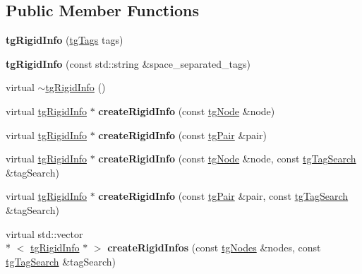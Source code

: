 \subsection*{Public Member Functions}
\begin{DoxyCompactItemize}
\item 
\hypertarget{classtg_rigid_info_afd0e27834c2f88732f1d7dbbe077f745}{{\bfseries tg\-Rigid\-Info} (\hyperlink{classtg_tags}{tg\-Tags} tags)}\label{classtg_rigid_info_afd0e27834c2f88732f1d7dbbe077f745}

\item 
\hypertarget{classtg_rigid_info_ae9228bfcf969ea281009e7091669b4a3}{{\bfseries tg\-Rigid\-Info} (const std\-::string \&space\-\_\-separated\-\_\-tags)}\label{classtg_rigid_info_ae9228bfcf969ea281009e7091669b4a3}

\item 
virtual \hyperlink{classtg_rigid_info_ac8a9f4cc598d4a4914ae20a574cd7248}{$\sim$tg\-Rigid\-Info} ()
\item 
\hypertarget{classtg_rigid_info_a5d2a96b8148b75b8bb71640c74e355cb}{virtual \hyperlink{classtg_rigid_info}{tg\-Rigid\-Info} $\ast$ {\bfseries create\-Rigid\-Info} (const \hyperlink{classtg_node}{tg\-Node} \&node)}\label{classtg_rigid_info_a5d2a96b8148b75b8bb71640c74e355cb}

\item 
\hypertarget{classtg_rigid_info_ab49822de5b103feac5e08465618873de}{virtual \hyperlink{classtg_rigid_info}{tg\-Rigid\-Info} $\ast$ {\bfseries create\-Rigid\-Info} (const \hyperlink{classtg_pair}{tg\-Pair} \&pair)}\label{classtg_rigid_info_ab49822de5b103feac5e08465618873de}

\item 
\hypertarget{classtg_rigid_info_a06b02534af62fa7c935accf8321a4c8f}{virtual \hyperlink{classtg_rigid_info}{tg\-Rigid\-Info} $\ast$ {\bfseries create\-Rigid\-Info} (const \hyperlink{classtg_node}{tg\-Node} \&node, const \hyperlink{classtg_tag_search}{tg\-Tag\-Search} \&tag\-Search)}\label{classtg_rigid_info_a06b02534af62fa7c935accf8321a4c8f}

\item 
\hypertarget{classtg_rigid_info_aec3117ed1b4e6561930fa2709805073e}{virtual \hyperlink{classtg_rigid_info}{tg\-Rigid\-Info} $\ast$ {\bfseries create\-Rigid\-Info} (const \hyperlink{classtg_pair}{tg\-Pair} \&pair, const \hyperlink{classtg_tag_search}{tg\-Tag\-Search} \&tag\-Search)}\label{classtg_rigid_info_aec3117ed1b4e6561930fa2709805073e}

\item 
\hypertarget{classtg_rigid_info_a54605e906e00a814e1494375602e02ee}{virtual std\-::vector\\*
$<$ \hyperlink{classtg_rigid_info}{tg\-Rigid\-Info} $\ast$ $>$ {\bfseries create\-Rigid\-Infos} (const \hyperlink{classtg_nodes}{tg\-Nodes} \&nodes, const \hyperlink{classtg_tag_search}{tg\-Tag\-Search} \&tag\-Search)}\label{classtg_rigid_info_a54605e906e00a814e1494375602e02ee}


\end{DoxyCompactItemize}
